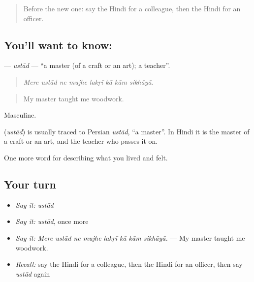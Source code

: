\label{lesson:HI-C507-ustad}



\begin{quote}
Before the new one: say the Hindi for a colleague, then the Hindi for an officer.
\end{quote}

\subsection*{You'll want to know: }
\textbf{} — \emph{ustād} — \textquotedblleft{}a master (of a craft or an art); a teacher\textquotedblright{}.

\begin{quote}
       
\end{quote}

\begin{quote}
\emph{Mere ustād ne mujhe lakṛī kā kām sikhāyā.}
\end{quote}

\begin{quote}
My master taught me woodwork.
\end{quote}

Masculine.

\begin{cousinweb}
\textbf{} (\emph{ustād}) is usually traced to Persian \emph{ustād}, \textquotedblleft{}a master\textquotedblright{}. In Hindi it is the master of a craft or an art, and the teacher who passes it on.
\end{cousinweb}

\begin{grammarlens}[title={What you've built}]
One more word for describing what you lived and felt.
\end{grammarlens}

\subsection*{Your turn}
\begin{itemize}
\raggedright
  \item \emph{Say it:} \emph{ustād}
  \item \emph{Say it:} \emph{ustād}, once more
  \item \emph{Say it:} \emph{Mere ustād ne mujhe lakṛī kā kām sikhāyā.} — My master taught me woodwork.
  \item \emph{Recall:} say the Hindi for a colleague, then the Hindi for an officer, then say \emph{ustād} again
\end{itemize}

